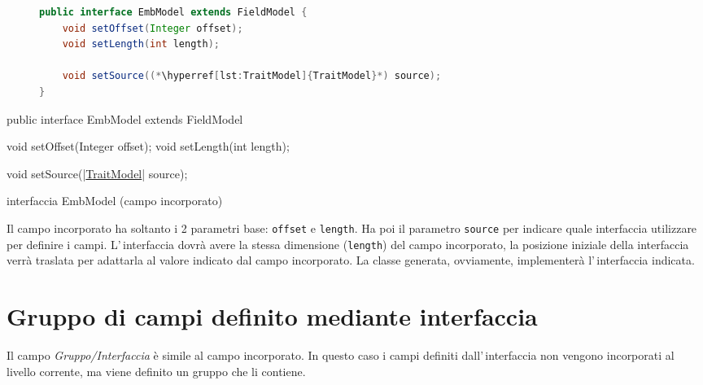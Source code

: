 \ifesource
\begin{figure*}[!htb]
\begin{lstlisting}[language=java, 
caption=interfaccia EmbModel (campo incorporato), 
label=lst:EmbModel]
public interface EmbModel extends FieldModel {
    void setOffset(Integer offset);
    void setLength(int length);
    
    void setSource((*\hyperref[lst:TraitModel]{TraitModel}*) source);
}
\end{lstlisting}
\end{figure*}
\else
\begin{elisting}[!htb]
\begin{javacode}
public interface EmbModel extends FieldModel {
    void setOffset(Integer offset);
    void setLength(int length);
    
    void setSource(|\hyperref[lst:TraitModel]{TraitModel}| source);
}
\end{javacode}
\caption{interfaccia EmbModel (campo incorporato)}
\label{lst:EmbModel}
\end{elisting}
\fi
Il campo incorporato ha soltanto i 2 parametri base: \verb!offset! e 
\verb!length!.
Ha poi il parametro \verb!source! per indicare quale interfaccia utilizzare per
definire i campi. L'\,interfaccia dovrà avere la stessa dimensione 
(\verb!length!) del campo incorporato, la posizione iniziale della interfaccia
verrà traslata per adattarla al valore indicato dal campo incorporato.
La classe generata, ovviamente, implementerà l'\,interfaccia indicata.

\section{Gruppo di campi definito mediante interfaccia} 
Il campo \textsl{Gruppo/Interfaccia} è simile al campo incorporato.
In questo caso i campi definiti dall'\,interfaccia non vengono incorporati al
livello corrente, ma viene definito un gruppo che li contiene.

